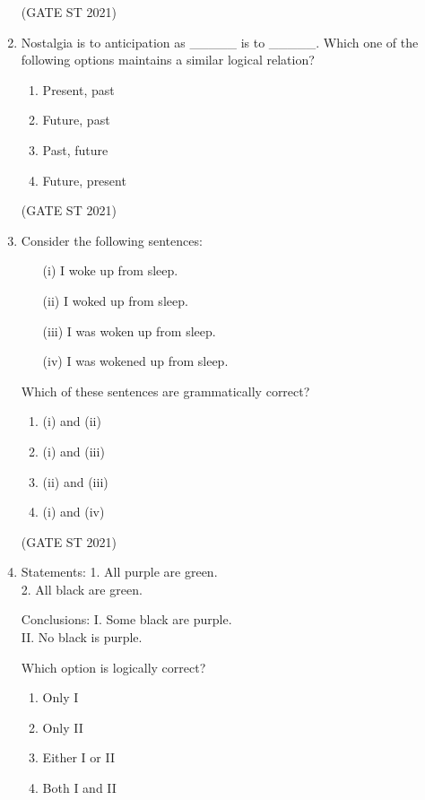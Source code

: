 \documentclass[journal,12pt,onecolumn]{IEEEtran}
\theoremstyle{remark}
\begin{document}
\begin{enumerate}
\hfill (GATE ST 2021) \\



\item
Nostalgia is to anticipation as \_\_\_\_\_ is to \_\_\_\_\_.  
Which one of the following options maintains a similar logical relation?

\begin{enumerate}
\item Present, past
\item Future, past
\item Past, future
\item Future, present
\end{enumerate}
\hfill (GATE ST 2021)

 

\item
Consider the following sentences:
\begin{enumerate}
\item[(i)] I woke up from sleep.
\item[(ii)] I woked up from sleep.
\item[(iii)] I was woken up from sleep.
\item[(iv)] I was wokened up from sleep.
\end{enumerate}
Which of these sentences are grammatically correct?
\begin{enumerate}
\item (i) and (ii)
\item (i) and (iii)
\item (ii) and (iii)
\item (i) and (iv)
\end{enumerate}
\hfill (GATE ST 2021)\\



\item
Statements:  
1. All purple are green. \\ 
2. All black are green.  

Conclusions: 
I. Some black are purple.  \\
II. No black is purple.

Which option is logically correct?
\begin{enumerate}
\item Only I  
\item Only II  
\item Either I or II  
\item Both I and II
\end{enumerate}


\end{enumerate}
\end{document}
